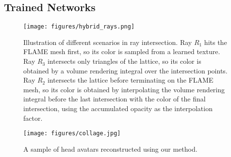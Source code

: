 \subsection{Trained Networks}
\label{subsec_model_networks}

\begin{figure}
    \texttt{[image: figures/hybrid\_rays.png]}
    \caption{Illustration of different scenarios in ray intersection. Ray $R_1$ hits the FLAME mesh first, so its color is sampled from a learned texture. Ray $R_3$ intersects only triangles of the lattice, so its color is obtained by a volume rendering integral over the intersection points. Ray $R_2$ intersects the lattice before terminating on the FLAME mesh, so its color is obtained by interpolating the volume rendering integral before the last intersection with the color of the final intersection, using the accumulated opacity as the interpolation factor.}
    \label{fig_hybrid_rays}
\end{figure}

\begin{figure*}[h!]
    \centering \texttt{[image: figures/collage.jpg]}
    \caption{A sample of head avatars reconstructed using our method.}
    \label{fig_results_collage}
\end{figure*}

